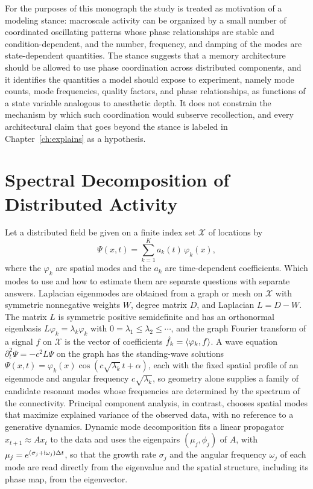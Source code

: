 For the purposes of this monograph the study is treated as motivation of a modeling stance: macroscale activity can be organized by a small number of coordinated oscillating patterns whose phase relationships are stable and condition-dependent, and the number, frequency, and damping of the modes are state-dependent quantities. The stance suggests that a memory architecture should be allowed to use phase coordination across distributed components, and it identifies the quantities a model should expose to experiment, namely mode counts, mode frequencies, quality factors, and phase relationships, as functions of a state variable analogous to anesthetic depth. It does not constrain the mechanism by which such coordination would subserve recollection, and every architectural claim that goes beyond the stance is labeled in Chapter~\ref{ch:explains} as a hypothesis.

\chapter{Spectral Decomposition of Distributed Activity}\label{ch:spectral}

Let a distributed field be given on a finite index set $\mathcal X$ of locations by
\begin{equation}\label{eq:modes}
\Psi(x,t)=\sum_{k=1}^{K}a_k(t)\,\varphi_k(x),
\end{equation}
where the $\varphi_k$ are spatial modes and the $a_k$ are time-dependent coefficients. Which modes to use and how to estimate them are separate questions with separate answers. Laplacian eigenmodes are obtained from a graph or mesh on $\mathcal X$ with symmetric nonnegative weights $W$, degree matrix $D$, and Laplacian $L=D-W$. The matrix $L$ is symmetric positive semidefinite and has an orthonormal eigenbasis $L\varphi_k=\lambda_k\varphi_k$ with $0=\lambda_1\le\lambda_2\le\cdots$, and the graph Fourier transform of a signal $f$ on $\mathcal X$ is the vector of coefficients $\hat f_k=\langle \varphi_k,f\rangle$. A wave equation $\partial_t^2\Psi=-c^2L\Psi$ on the graph has the standing-wave solutions $\Psi(x,t)=\varphi_k(x)\cos(c\sqrt{\lambda_k}\,t+\alpha)$, each with the fixed spatial profile of an eigenmode and angular frequency $c\sqrt{\lambda_k}$, so geometry alone supplies a family of candidate resonant modes whose frequencies are determined by the spectrum of the connectivity. Principal component analysis, in contrast, chooses spatial modes that maximize explained variance of the observed data, with no reference to a generative dynamics. Dynamic mode decomposition fits a linear propagator $x_{t+1}\approx Ax_t$ to the data and uses the eigenpairs $(\mu_j,\phi_j)$ of $A$, with $\mu_j=e^{(\sigma_j+\mathrm{i}\omega_j)\Delta t}$, so that the growth rate $\sigma_j$ and the angular frequency $\omega_j$ of each mode are read directly from the eigenvalue and the spatial structure, including its phase map, from the eigenvector.

